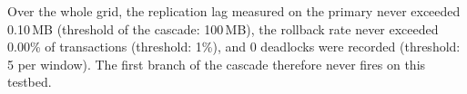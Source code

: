 Over the whole grid, the replication lag measured on the primary never exceeded 0.10\,MB (threshold of the cascade: 100\,MB), the rollback rate never exceeded 0.00\% of transactions (threshold: 1\%), and 0 deadlocks were recorded (threshold: 5 per window). The first branch of the cascade therefore never fires on this testbed.
